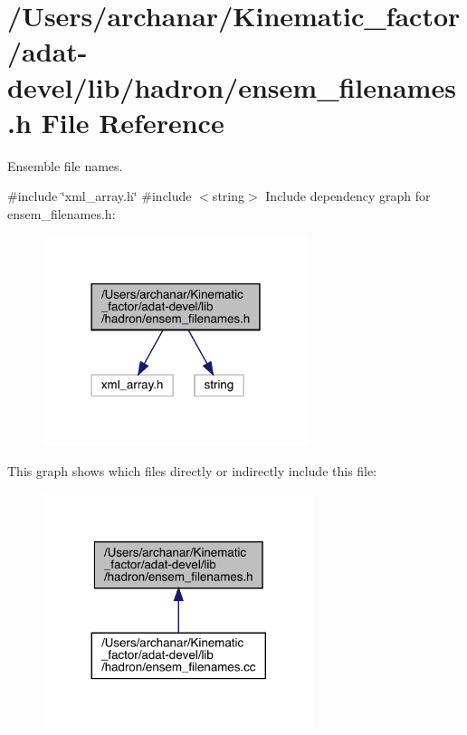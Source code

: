 \hypertarget{adat-devel_2lib_2hadron_2ensem__filenames_8h}{}\section{/\+Users/archanar/\+Kinematic\+\_\+factor/adat-\/devel/lib/hadron/ensem\+\_\+filenames.h File Reference}
\label{adat-devel_2lib_2hadron_2ensem__filenames_8h}


Ensemble file names.  


{\ttfamily \#include \char`\"{}xml\+\_\+array.\+h\char`\"{}}\newline
{\ttfamily \#include $<$string$>$}\newline
Include dependency graph for ensem\+\_\+filenames.\+h\+:
\nopagebreak
\begin{figure}[H]
\begin{center}
\leavevmode
\includegraphics[width=219pt]{db/d5d/adat-devel_2lib_2hadron_2ensem__filenames_8h__incl}
\end{center}
\end{figure}
This graph shows which files directly or indirectly include this file\+:
\nopagebreak
\begin{figure}[H]
\begin{center}
\leavevmode
\includegraphics[width=224pt]{df/d3b/adat-devel_2lib_2hadron_2ensem__filenames_8h__dep__incl}
\end{center}
\end{figure}
